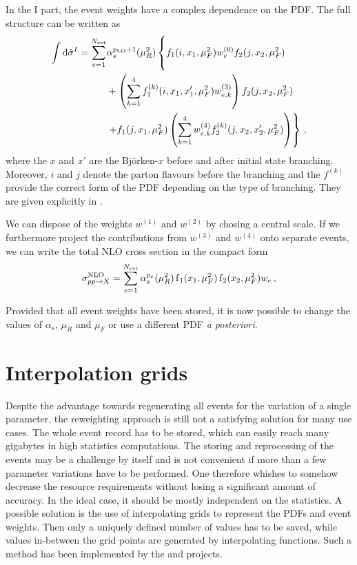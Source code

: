 In the I part, the event weights have a complex dependence on the PDF.
The full structure can be written as
%
\begin{align}
	\int \dif \hat \sigma^I = \sum_{e=1}^{N_\text{evt}} &\alpha_s^{p_\text{LO} + 1}(\mu_R^2) \left\{ \vphantom{\left( \sum_{k=1}^4 \right)} f_1(i,x_1,\mu_F^2) w_e^{(0)} f_2(j,x_2,\mu_F^2) \right. \nonumber \\
								&+ \left( \sum_{k=1}^4 f_1^{(k)}(i,x_1,x'_1,\mu_F^2) w_{e,k}^{(3)} \right) f_2(j,x_2,\mu_F^2) \nonumber \\
								&\left. + f_1(j,x_1,\mu_F^2) \left( \sum_{k=1}^4 w_{e,k}^{(4)} f_2^{(k)}(j,x_2,x'_2,\mu_F^2) \right) \right\} \, ,
\end{align}
%
where the $x$ and $x'$ are the Björken-$x$ before and after initial state branching.
Moreover, $i$ and $j$ denote the parton flavours before the branching and the $f^{(k)}$ provide the correct form of the PDF depending on the type of branching.
They are given explicitly in \cite{mcgrid2013}.

We can dispose of the weights $w^{(1)}$ and $w^{(2)}$ by chosing a central scale.
If we furthermore project the contributions from $w^{(3)}$ and $w^{(4)}$ onto separate events, we can write the total NLO cross section in the compact form
%
\begin{equation}
  \sigma^\text{NLO}_{pp \rightarrow X} = \sum_{e=1}^{N_\text{evt}} \alpha_s^{p_e}(\mu_R^2) \operatorname{f}_1(x_1,\mu_F^2) \operatorname{f}_2(x_2,\mu_F^2) w_e \, ,
  \label{eq:reweight_nlo}
\end{equation}
%

Provided that all event weights have been stored, it is now possible to change the values of $\alpha_s$, $\mu_R$ and $\mu_F$ or use a different PDF \textit{a posteriori}.
%
\section{Interpolation grids}
Despite the advantage towards regenerating all events for the variation of a single parameter, the reweighting approach is still not a satisfying solution for many use cases.
The whole event record has to be stored, which can easily reach many gigabytes in high statistics computations.
The storing and reprocessing of the events may be a challenge by itself and is not convenient if more than a few parameter variations have to be performed.
One therefore whishes to somehow decrease the resource requirements without losing a significant amount of accuracy.
In the ideal case, it should be mostly independent on the statistics.
A possible solution is the use of interpolating grids to represent the PDFs and event weights.
Then only a uniquely defined number of values has to be saved, while values in-between the grid points are generated by interpolating functions.
Such a method has been implemented by the \appl{} \cite{applgrid2010} and \fnlo{} \cite{fastnlo2006,fastnlo2011} projects.

